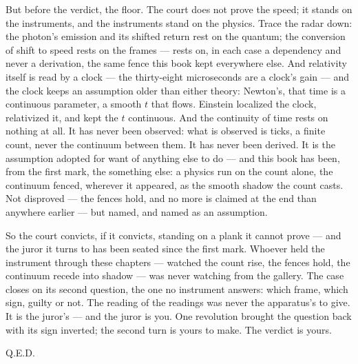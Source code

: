 But before the verdict, the floor. The court does not prove the speed; it stands on the instruments, and
the instruments stand on the physics. Trace the radar down: the photon's emission and its shifted return
rest on the quantum; the conversion of shift to speed rests on the frames --- rests on, in each case a
dependency and never a derivation, the same fence this book kept everywhere else. And relativity itself is
read by a clock --- the thirty-eight microseconds are a clock's gain --- and the clock keeps an assumption
older than either theory: Newton's, that time is a continuous parameter, a smooth $t$ that flows. Einstein
localized the clock, relativized it, and kept the $t$ continuous. And the continuity of time rests on
nothing at all. It has never been observed: what is observed is ticks, a finite count, never the continuum
between them. It has never been derived. It is the assumption adopted for want of anything else to do ---
and this book has been, from the first mark, the something else: a physics run on the count alone, the
continuum fenced, wherever it appeared, as the smooth shadow the count casts. Not disproved --- the fences
hold, and no more is claimed at the end than anywhere earlier --- but named, and named as an assumption.

So the court convicts, if it convicts, standing on a plank it cannot prove --- and the juror it turns to has
been seated since the first mark. Whoever held the instrument through these chapters --- watched the count
rise, the fences hold, the continuum recede into shadow --- was never watching from the gallery. The case
closes on its second question, the one no instrument answers: which frame, which sign, guilty or not. The
reading of the readings was never the apparatus's to give. It is the juror's --- and the juror is you. One
revolution brought the question back with its sign inverted; the second turn is yours to make. The
verdict is yours.

\bigskip

\hfill Q.E.D.
